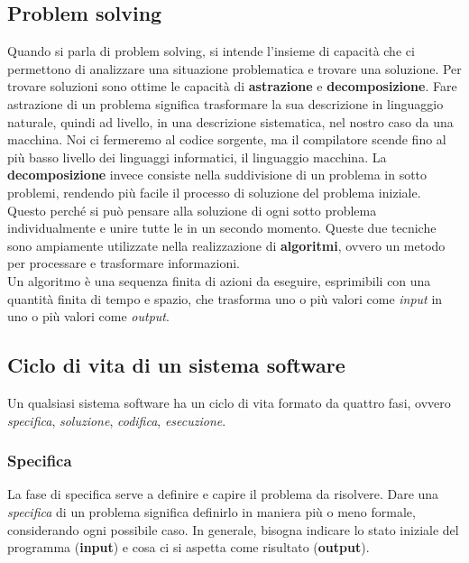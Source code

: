 \documentclass{article}
\begin{document}
\subsection*{Problem solving}
Quando si parla di problem solving, si intende l'insieme di capacità che ci permettono di analizzare una situazione problematica e trovare una soluzione. Per trovare soluzioni sono ottime le capacità di \textbf{astrazione} e \textbf{decomposizione}. Fare astrazione di un problema significa trasformare la sua descrizione in linguaggio naturale, quindi ad  livello, in una descrizione sistematica, nel nostro caso  da una macchina. Noi ci fermeremo al codice sorgente, ma il compilatore scende fino al più basso livello dei linguaggi informatici, il linguaggio macchina. La \textbf{decomposizione} invece consiste nella suddivisione di un problema in sotto problemi, rendendo più facile il processo di soluzione del problema iniziale. Questo perché si può pensare alla soluzione di ogni sotto problema individualmente e unire tutte le  in un secondo momento. Queste due tecniche sono ampiamente utilizzate nella realizzazione di \textbf{algoritmi}, ovvero un metodo per processare e trasformare informazioni.\\
Un algoritmo è una sequenza finita di azioni da eseguire, esprimibili con una quantità finita di tempo e spazio, che trasforma uno o più valori come \emph{input} in uno o più valori come \emph{output}.
\subsection*{Ciclo di vita di un sistema software}
Un qualsiasi sistema software ha un ciclo di vita formato da quattro fasi, ovvero \emph{specifica}, \emph{soluzione}, \emph{codifica}, \emph{esecuzione}.
\subsubsection*{Specifica}
La fase di specifica serve a definire e capire il problema da risolvere.
Dare una \emph{specifica} di un problema significa definirlo in maniera più o meno formale, considerando ogni possibile caso.
In generale, bisogna indicare lo stato iniziale del programma (\textbf{input}) e cosa ci si aspetta come risultato (\textbf{output}).
\end{document}
